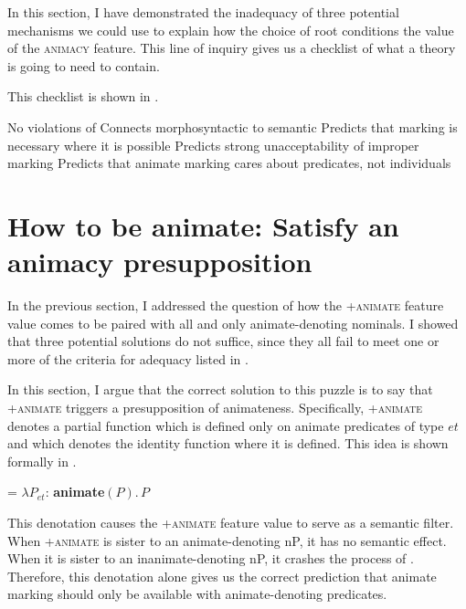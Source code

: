 \documentclass[output=paper,newtxmath,modfonts,nonflat,hidelinks]{langsci/langscibook}
\begin{document}
In this section, I have demonstrated the inadequacy of three potential mechanisms we could use to explain how the choice of root conditions the value of the \textsc{animacy} feature.  This line of inquiry gives us a checklist of what a theory is going to need to contain.  

This checklist is shown in .

\ea\label{ex:pesetsky:checklist} \ea No violations of  \label{ex:pesetsky:checklista}
\ex\label{ex:pesetsky:checklistb} Connects morphosyntactic  to semantic  
\ex\label{ex:pesetsky:checklistc} Predicts that  marking is necessary where it is possible 
\ex\label{ex:pesetsky:checklistd} Predicts strong unacceptability of improper  marking 
\ex\label{ex:pesetsky:checkliste} Predicts that animate marking cares about predicates, not individuals \\ \z \z

\section{How to be animate: Satisfy an animacy presupposition} \label{sec:pesetsky:satisfyapresupposition}

In the previous section, I addressed the question of how the +\textsc{animate} feature value comes to be paired with all and only animate-denoting nominals.  I showed that three potential solutions do not suffice, since they all fail to meet one or more of the criteria for adequacy listed in .

In this section, I argue that the correct solution to this puzzle is to say that +\textsc{animate} triggers a presupposition of animateness.  Specifically, +\textsc{animate} denotes a partial function which is defined only on animate predicates of type $et$ and which denotes the identity function where it is defined.  This idea is shown formally in .
 
\ea\label{ex:pesetsky:lambdas}  = $\lambda P_{et}: \,$\textbf{animate}$(P).\,P$ \z

This denotation causes the +\textsc{animate} feature value to serve as a semantic filter.  When +\textsc{animate} is sister to an animate-denoting nP, it has no semantic effect.  When it is sister to an inanimate-denoting nP, it crashes the process of . Therefore, this denotation alone gives us the correct prediction that animate marking should only be available with animate-denoting predicates.
\end{document}
